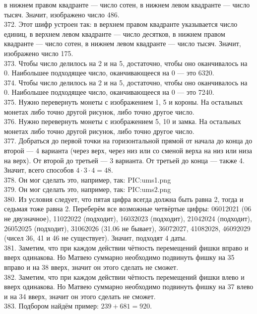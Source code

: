 в нижнем правом квадранте --- число сотен, в нижнем левом квадранте --- число тысяч. Значит, изображено число 486.\\
372. Этот шифр устроен так: в верхнем правом квадранте указывается число единиц, в верхнем левом квадранте --- число десятков,
в нижнем правом квадранте --- число сотен, в нижнем левом квадранте --- число тысяч. Значит, изображено число 175.\\
373. Чтобы число делилось на 2 и на 5, достаточно, чтобы оно оканчивалось на 0. Наибольшее подходящее число, оканчивающееся на 0 --- это 6320.\\
374. Чтобы число делилось на 2 и на 5, достаточно, чтобы оно оканчивалось на 0. Наибольшее подходящее число, оканчивающееся на 0 --- это 7240.\\
375. Нужно перевернуть монеты с изображением 1, 5 и короны. На остальных монетах либо точно другой рисунок, либо точно другое число.\\
376. Нужно перевернуть монеты с изображением 5, 10 и замка. На остальных монетах либо точно другой рисунок, либо точно другое число.\\
377. Добраться до первой точки на горизонтальной прямой от начала до конца до второй --- 4 варианта (через верх, через низ или со сменой верха на низ или низа на верх). От второй до третьей --- 3 варианта. От третьей до конца --- также 4. Значит, всего способов $4\cdot3\cdot4=48.$\\
378. Он мог сделать это, например, так:
{{PIC:ums1.png}}\\
379. Он мог сделать это, например, так:
{{PIC:ums2.png}}\\
380. Из условия следует, что пятая цифра всегда должна быть равна 2, тогда и седьмая тоже равна 2. Переберём все возможные четвёртые цифры: 06012021 (06 не двузначное), 11022022 (подходит), 16032023 (подходит), 21042024 (подходит), 26052025 (подходит), 31062026 (31.06 не бывает), 36072027, 41082028, 46092029 (чисел 36, 41 и 46 не существует). Значит, подходят 4 даты.\\
381. Заметим, что при каждом действии чётность перемещений фишки вправо и вверх одинакова. Но Матвею суммарно необходимо подвинуть фишку на 35 вправо и на 38 вверх, значит он этого сделать не сможет.\\
382. Заметим, что при каждом действии чётность перемещений фишки влево и вверх одинакова. Но Матвею суммарно необходимо подвинуть фишку на 37 влево и на 34 вверх, значит он этого сделать не сможет.\\
383. Подбором найдём пример: $239+681=920.$\\
